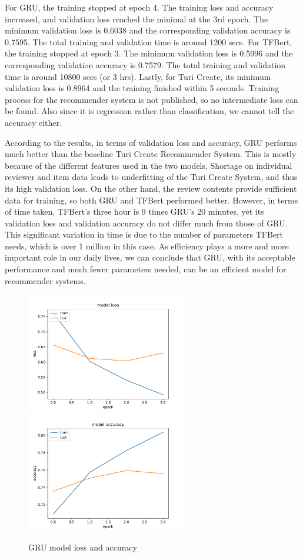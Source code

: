 \documentclass[12pt]{article}
\begin{document}
For GRU, the training stopped at epoch 4. The training loss and accuracy increased, and validation loss reached the minimal at the 3rd epoch. The minimum validation loss is 0.6038 and the corresponding validation accuracy is 0.7595. The total training and validation time is around 1200 secs. For TFBert, the training stopped at epoch 3. The minimum validation loss is 0.5996 and the corresponding validation accuracy is 0.7579. The total training and validation time is around 10800 secs (or 3 hrs). Lastly, for Turi Create, its minimum validation loss is 0.8964 and the training finished within 5 seconds. Training process for the recommender system is not published, so no intermediate loss can be found. Also since it is regression rather than classification, we cannot tell the accuracy either. 

According to the results, in terms of validation loss and accuracy, GRU performs much better than the baseline Turi Create Recommender System. This is mostly because of the different features used in the two models. Shortage on individual reviewer and item data leads to underfitting of the Turi Create System, and thus its high validation loss. On the other hand, the review contents provide sufficient data for training, so both GRU and TFBert performed better. However, in terms of time taken, TFBert’s three hour is 9 times GRU’s 20 minutes, yet its validation loss and validation accuracy do not differ much from those of GRU. This significant variation in time is due to the number of parameters TFBert needs, which is over 1 million in this case. As efficiency plays a more and more important role in our daily lives, we can conclude that GRU, with its acceptable performance and much fewer parameters needed, can be an efficient model for recommender systems.
\begin{figure}[h!]
    \centering
    \includegraphics[width=70mm,scale=0.5]{gru_loss.pdf}
    \includegraphics[width=70mm,scale=0.5]{gru_accuracy.pdf}
    \caption{GRU model loss and accuracy}
    \label{fig:gru}
\end{figure}
\end{document}
